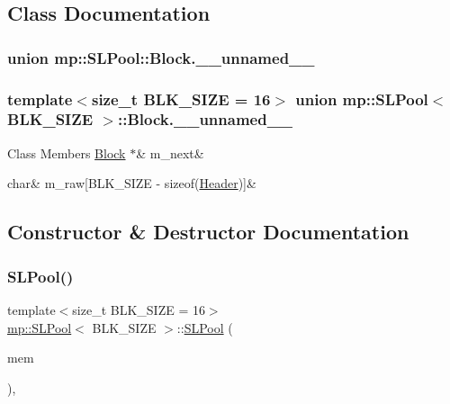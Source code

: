 \subsection{Class Documentation}
\label{unionmp_1_1_s_l_pool_1_1_block_8____unnamed____}
\subsubsection{union mp\+:\+:S\+L\+Pool\+:\+:Block.\+\_\+\+\_\+unnamed\+\_\+\+\_\+}
\subsubsection*{template$<$size\+\_\+t B\+L\+K\+\_\+\+S\+I\+ZE = 16$>$\newline
union mp\+::\+S\+L\+Pool$<$ B\+L\+K\+\_\+\+S\+I\+Z\+E $>$\+::\+Block.\+\_\+\+\_\+unnamed\+\_\+\+\_\+}

\begin{DoxyFields}{Class Members}
\mbox{\label{classmp_1_1_s_l_pool_a3bfb47e8362544e4462b7fae503e3774}} 
\hyperlink{structmp_1_1_s_l_pool_1_1_block}{Block} $\ast$&
m\_next&
\\
\hline

\mbox{\label{classmp_1_1_s_l_pool_a380f5cc05b47f6bb73d4b4c8ccd91090}} 
char&
m\_raw\mbox{[}BLK\_SIZE -\/ sizeof(\hyperlink{structmp_1_1_s_l_pool_1_1_header}{Header})\mbox{]}&
\\
\hline

\end{DoxyFields}


\subsection{Constructor \& Destructor Documentation}
\mbox{\label{classmp_1_1_s_l_pool_a9f1a91197f85fac54d0ed7f4f2d53b6e}} 
\subsubsection{\texorpdfstring{S\+L\+Pool()}{SLPool()}}
{\footnotesize\ttfamily template$<$size\+\_\+t B\+L\+K\+\_\+\+S\+I\+ZE = 16$>$ \\
\hyperlink{classmp_1_1_s_l_pool}{mp\+::\+S\+L\+Pool}$<$ B\+L\+K\+\_\+\+S\+I\+ZE $>$\+::\hyperlink{classmp_1_1_s_l_pool}{S\+L\+Pool} (\begin{DoxyParamCaption}\item[{size\+\_\+t}]{mem }\end{DoxyParamCaption})\hspace{0.3cm}{\ttfamily [inline]}, {\ttfamily [explicit]}}

